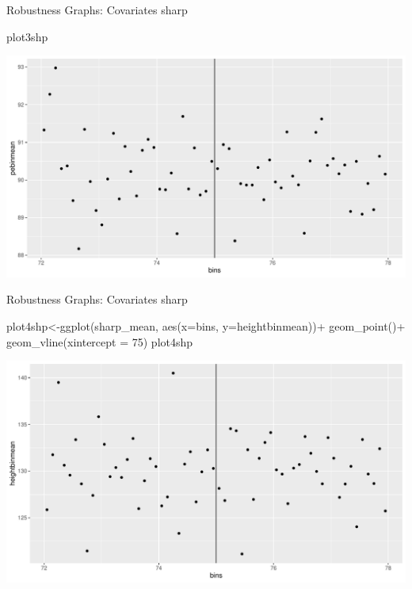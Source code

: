 \documentclass[
  ignorenonframetext,
]{beamer}
\newenvironment{Shaded}{\begin{snugshade}}{\end{snugshade}}
\newcommand{\AttributeTok}[1]{\textcolor[rgb]{0.77,0.63,0.00}{#1}}
\newcommand{\DecValTok}[1]{\textcolor[rgb]{0.00,0.00,0.81}{#1}}
\newcommand{\FunctionTok}[1]{\textcolor[rgb]{0.00,0.00,0.00}{#1}}
\newcommand{\NormalTok}[1]{#1}
\newcommand{\OtherTok}[1]{\textcolor[rgb]{0.56,0.35,0.01}{#1}}
\newcommand{\SpecialCharTok}[1]{\textcolor[rgb]{0.00,0.00,0.00}{#1}}
\begin{document}
\begin{frame}[fragile]{Robustness Graphs: Covariates sharp}
\protect\hypertarget{robustness-graphs-covariates-sharp-1}{}
\begin{Shaded}
\begin{Highlighting}[]
\NormalTok{plot3shp}
\end{Highlighting}
\end{Shaded}

\includegraphics{Slides9_RD_files/figure-beamer/sharp4d-1.pdf}
\end{frame}

\begin{frame}[fragile]{Robustness Graphs: Covariates sharp}
\protect\hypertarget{robustness-graphs-covariates-sharp-2}{}
\tiny

\begin{Shaded}
\begin{Highlighting}[]
\NormalTok{plot4shp}\OtherTok{\textless{}{-}}\FunctionTok{ggplot}\NormalTok{(sharp\_mean, }\FunctionTok{aes}\NormalTok{(}\AttributeTok{x=}\NormalTok{bins, }\AttributeTok{y=}\NormalTok{heightbinmean))}\SpecialCharTok{+} 
         \FunctionTok{geom\_point}\NormalTok{()}\SpecialCharTok{+}
         \FunctionTok{geom\_vline}\NormalTok{(}\AttributeTok{xintercept =} \DecValTok{75}\NormalTok{)}
\NormalTok{plot4shp}
\end{Highlighting}
\end{Shaded}

\includegraphics{Slides9_RD_files/figure-beamer/sharp4b-1.pdf}
\end{frame}
\end{document}
